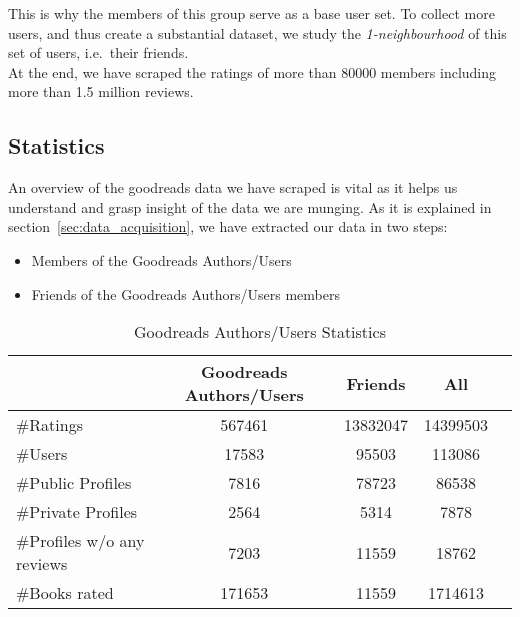 \documentclass[11pt]{article}
\begin{document}
This is why the members of this group serve as a base user set.
To collect more users, and thus create a substantial dataset, we study the {\it 1-neighbourhood} of this set of users, i.e.\ their friends.\\
At the end, we have scraped the ratings of more than 80000 members including more than 1.5 million reviews.

\subsection{Statistics}

An overview of the goodreads data we have scraped is vital as it helps us understand and grasp insight of the data we are munging.
As it is explained in section~\ref{sec:data_acquisition}, we have extracted our data in two steps:
\begin{itemize}
\item Members of the Goodreads Authors/Users
\item Friends of the Goodreads Authors/Users members
\end{itemize}

\begin{table}[h]
\begin{center}
\begin{tabular}{lcccc}
\hline
                           &  Goodreads Authors/Users    &   Friends                &   All        \\ \hline
\#Ratings                  &  567461                     &   13832047               &   14399503  \\ \hline
\#Users                    &  17583                      &   95503                  &   113086     \\ \hline
\#Public Profiles          &  7816                       &   78723                  &   86538     \\ \hline
\#Private Profiles         &  2564                       &   5314                   &   7878      \\ \hline
\#Profiles w/o any reviews &  7203                       &   11559                  &   18762      \\ \hline
\#Books rated              &  171653                     &   11559                  &   1714613      \\ \hline
\end{tabular}
\end{center}
\caption{Goodreads Authors/Users Statistics} \label{table:crawl_stat}
\end{table}
\end{document}
